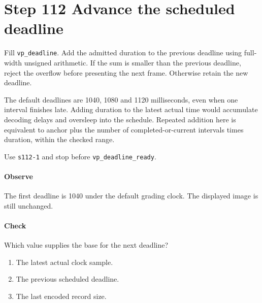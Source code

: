 \section{Step 112 Advance the scheduled deadline}
Fill \texttt{vp\_deadline}. Add the admitted duration to the previous deadline using full-width unsigned arithmetic. If the sum is smaller than the previous deadline, reject the overflow before presenting the next frame. Otherwise retain the new deadline.

The default deadlines are 1040, 1080 and 1120 milliseconds, even when one interval finishes late. Adding duration to the latest actual time would accumulate decoding delays and oversleep into the schedule. Repeated addition here is equivalent to anchor plus the number of completed-or-current intervals times duration, within the checked range.

Use \texttt{s112-1} and stop before \texttt{vp\_deadline\_ready}.

\paragraph{Observe} The first deadline is 1040 under the default grading clock. The displayed image is still unchanged.

\paragraph{Check} Which value supplies the base for the next deadline?
\begin{enumerate}[label=\Alph*.]
  \item The latest actual clock sample.
  \item The previous scheduled deadline.
  \item The last encoded record size.
\end{enumerate}

